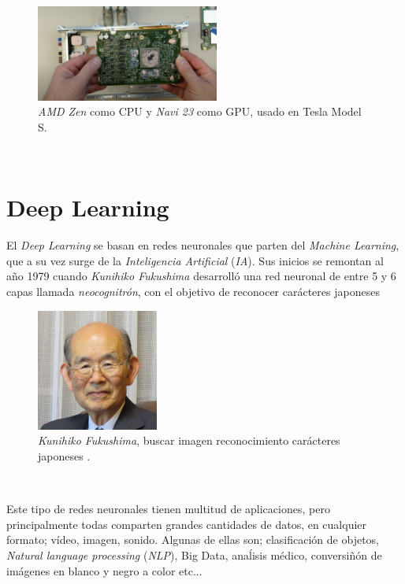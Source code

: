 \begin{figure} [h!]
	\begin{center}
		\includegraphics[width=6cm]{figs/tesla_zen_rdna2}
	\end{center}
	\caption{\textit{AMD Zen} como CPU y \textit{Navi 23} como GPU, usado en Tesla Model S.}
	\label{fig:teslazenrdna2}
\end{figure}\

\section{Deep Learning}
\label{sec:deeplearning}
El \textit{Deep Learning} se basan en redes neuronales que parten del \textit{Machine Learning}, que a su vez surge de la \textit{Inteligencia Artificial} (\textit{IA}). Sus inicios se remontan al año 1979 cuando \textit{Kunihiko Fukushima} desarrolló una red neuronal de entre 5 y 6 capas llamada \textit{neocognitrón}, con el objetivo de reconocer carácteres japoneses 

\begin{figure} [h!]
	\begin{center}
		\includegraphics[width=4cm]{figs/kuni}
	\end{center}
	\caption{\textit{Kunihiko Fukushima}, buscar imagen reconocimiento carácteres japoneses .}
	\label{fig:kuni}
\end{figure}\


Este tipo de redes neuronales tienen multitud de aplicaciones, pero principalmente todas comparten grandes cantidades de datos, en cualquier formato; vídeo, imagen, sonido. Algunas de ellas son; clasificación de objetos, \textit{Natural language processing} (\textit{NLP}), Big Data, anaĺisis médico, conversiñón de imágenes en blanco y negro a color etc...


